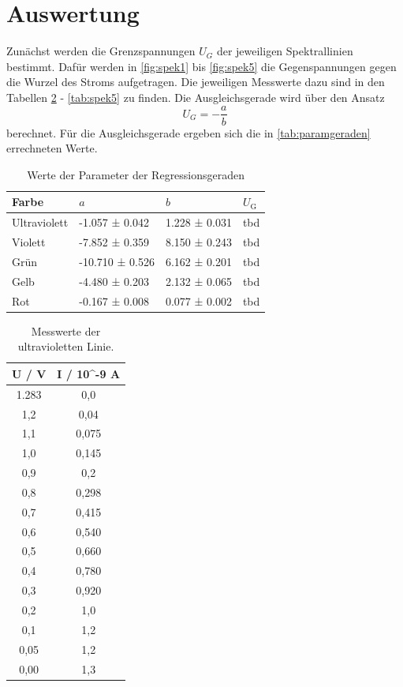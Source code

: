 \section{Auswertung}
\label{sec:Auswertung}

Zunächst werden die Grenzspannungen $U_G$ der jeweiligen Spektrallinien bestimmt.
Dafür werden in \autoref{fig:spek1} bis \autoref{fig:spek5} die Gegenspannungen gegen die Wurzel des Stroms aufgetragen.
Die jeweiligen Messwerte dazu sind in den Tabellen \ref{tab:spek1} - \ref{tab:spek5} zu finden.
Die Ausgleichsgerade wird über den Ansatz 
\begin{equation*}
  U_G = - \frac{a}{b}
\end{equation*}
berechnet.
Für die Ausgleichsgerade ergeben sich die in \autoref{tab:paramgeraden} errechneten Werte.

\begin{table}
  \centering
  \caption{Werte der Parameter der Regressionsgeraden}
  \label{tab:paramgeraden}
  \begin{tabular}{ |p{3cm}||p{3cm}|p{3cm}|p{3cm}|  }
    \hline
    Farbe & $a$ & $b$ & $U_\text{G}$ \\
    \hline
    Ultraviolett   &  -1.057 ± 0.042   &1.228 ± 0.031 &   tbd\\
    Violett &   -7.852 ± 0.359  & 8.150 ± 0.243   & tbd\\
    Grün &-10.710 ± 0.526 & 6.162 ± 0.201 &  tbd\\
    Gelb    & -4.480 ± 0.203 & 2.132 ± 0.065 &  tbd\\
    Rot &   -0.167 ± 0.008  & 0.077 ± 0.002 & tbd\\
    \hline
   \end{tabular}
\end{table}

\begin{table}
  \centering
  \caption{Messwerte der ultravioletten Linie.}
  \label{tab:spek1}
  \begin{tabular}{c c}
    \toprule
    U / V & I / 10\textasciicircum -9 A \\
    \midrule
    1.283 &         0,0 \\
      1,2 &        0,04 \\
      1,1 &       0,075 \\
      1,0 &       0,145 \\
      0,9 &         0,2 \\
      0,8 &       0,298 \\
      0,7 &       0,415 \\
      0,6 &       0,540 \\
      0,5 &       0,660 \\
      0,4 &       0,780 \\
      0,3 &       0,920 \\
      0,2 &         1,0 \\
      0,1 &         1,2 \\
     0,05 &         1,2 \\
     0,00 &         1,3 \\
    \bottomrule
  \end{tabular}
\end{table}

